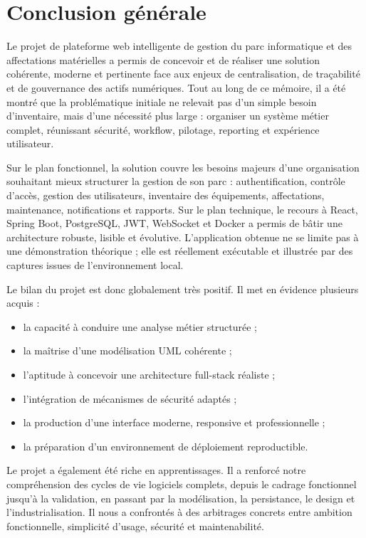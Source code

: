﻿\chapter*{Conclusion générale}

Le projet de plateforme web intelligente de gestion du parc informatique et des affectations matérielles a permis de concevoir et de réaliser une solution cohérente, moderne et pertinente face aux enjeux de centralisation, de traçabilité et de gouvernance des actifs numériques. Tout au long de ce mémoire, il a été montré que la problématique initiale ne relevait pas d'un simple besoin d'inventaire, mais d'une nécessité plus large : organiser un système métier complet, réunissant sécurité, workflow, pilotage, reporting et expérience utilisateur.

Sur le plan fonctionnel, la solution couvre les besoins majeurs d'une organisation souhaitant mieux structurer la gestion de son parc : authentification, contrôle d'accès, gestion des utilisateurs, inventaire des équipements, affectations, maintenance, notifications et rapports. Sur le plan technique, le recours à React, Spring Boot, PostgreSQL, JWT, WebSocket et Docker a permis de bâtir une architecture robuste, lisible et évolutive. L'application obtenue ne se limite pas à une démonstration théorique ; elle est réellement exécutable et illustrée par des captures issues de l'environnement local.

Le bilan du projet est donc globalement très positif. Il met en évidence plusieurs acquis :
\begin{itemize}
  \item la capacité à conduire une analyse métier structurée ;
  \item la maîtrise d'une modélisation UML cohérente ;
  \item l'aptitude à concevoir une architecture full-stack réaliste ;
  \item l'intégration de mécanismes de sécurité adaptés ;
  \item la production d'une interface moderne, responsive et professionnelle ;
  \item la préparation d'un environnement de déploiement reproductible.
\end{itemize}

Le projet a également été riche en apprentissages. Il a renforcé notre compréhension des cycles de vie logiciels complets, depuis le cadrage fonctionnel jusqu'à la validation, en passant par la modélisation, la persistance, le design et l'industrialisation. Il nous a confrontés à des arbitrages concrets entre ambition fonctionnelle, simplicité d'usage, sécurité et maintenabilité.

